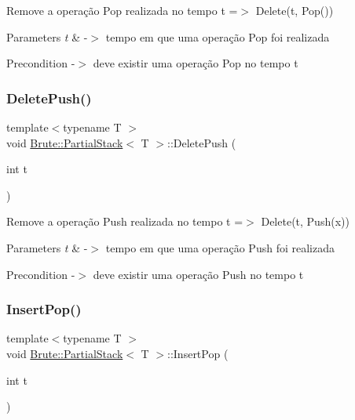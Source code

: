 Remove a operação Pop realizada no tempo t =$>$ Delete(t, Pop())


\begin{DoxyParams}{Parameters}
{\em t} & -\/$>$ tempo em que uma operação Pop foi realizada \\
\hline
\end{DoxyParams}
\begin{DoxyPrecond}{Precondition}
-\/$>$ deve existir uma operação Pop no tempo t 
\end{DoxyPrecond}
\mbox{\label{classBrute_1_1PartialStack_af872304f5d93e50b1e704dc8f6b13d34}} 
\subsubsection{\texorpdfstring{Delete\+Push()}{DeletePush()}}
{\footnotesize\ttfamily template$<$typename T $>$ \\
void \hyperlink{classBrute_1_1PartialStack}{Brute\+::\+Partial\+Stack}$<$ T $>$\+::Delete\+Push (\begin{DoxyParamCaption}\item[{int}]{t }\end{DoxyParamCaption})}

Remove a operação Push realizada no tempo t =$>$ Delete(t, Push(x))


\begin{DoxyParams}{Parameters}
{\em t} & -\/$>$ tempo em que uma operação Push foi realizada \\
\hline
\end{DoxyParams}
\begin{DoxyPrecond}{Precondition}
-\/$>$ deve existir uma operação Push no tempo t 
\end{DoxyPrecond}
\mbox{\label{classBrute_1_1PartialStack_a347ebf205dac4ad1976180b1ec897af8}} 
\subsubsection{\texorpdfstring{Insert\+Pop()}{InsertPop()}}
{\footnotesize\ttfamily template$<$typename T $>$ \\
void \hyperlink{classBrute_1_1PartialStack}{Brute\+::\+Partial\+Stack}$<$ T $>$\+::Insert\+Pop (\begin{DoxyParamCaption}\item[{int}]{t }\end{DoxyParamCaption})}

